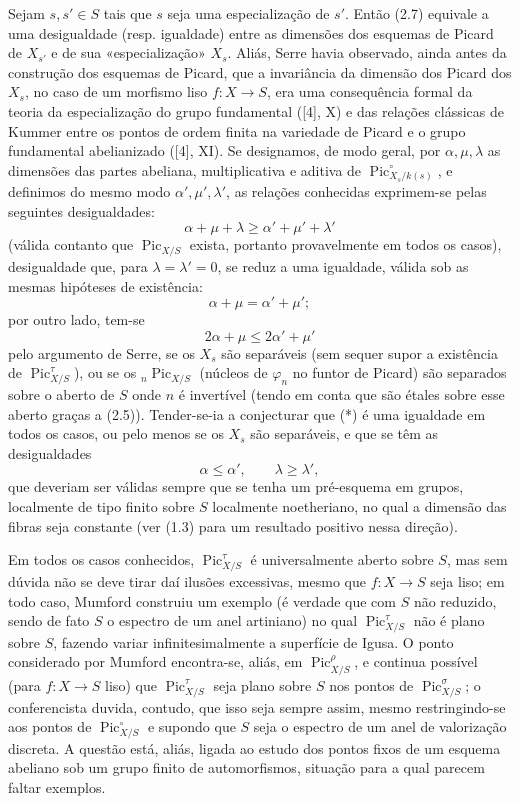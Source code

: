 Sejam $s,s'\in S$ tais que $s$ seja uma especialização
de $s'$. Então (2.7) equivale a uma desigualdade (resp. igualdade) entre as
dimensões dos esquemas de Picard de $X_{s'}$ e de sua «especialização» $X_s$.
Aliás, Serre havia observado, ainda antes da construção dos esquemas de Picard,
que a invariância da dimensão dos Picard dos $X_s$, no caso de um morfismo liso
$f:X\longrightarrow S$, era uma consequência formal da teoria da
especialização do grupo fundamental ([4], X) e das relações clássicas de Kummer
entre os pontos de ordem finita na variedade de Picard e o grupo fundamental
abelianizado ([4], XI). Se designamos, de modo geral, por $\alpha,\mu,\lambda$
as dimensões das partes abeliana, multiplicativa e aditiva de
$\operatorname{Pic}_{X_s/k(s)}^\circ$, e definimos do mesmo modo
$\alpha',\mu',\lambda'$, as relações conhecidas exprimem-se pelas seguintes
desigualdades:
\[
\tag{*}\alpha+\mu+\lambda\geq\alpha'+\mu'+\lambda'
\]
(válida contanto que $\operatorname{Pic}_{X/S}$ exista, portanto provavelmente
em todos os casos), desigualdade que, para $\lambda=\lambda'=0$, se reduz a uma
igualdade, válida sob as mesmas hipóteses de existência:
\[
\alpha+\mu=\alpha'+\mu' ;
\]
por outro lado, tem-se
\[
\tag{**}2\alpha+\mu\leq2\alpha'+\mu'
\]
pelo argumento de Serre, se os $X_s$ são separáveis (sem sequer supor a
existência de $\operatorname{Pic}_{X/S}^\tau$), ou se os
${}_n\operatorname{Pic}_{X/S}$ (núcleos de $\varphi_n$ no funtor de Picard) são
separados sobre o aberto de $S$ onde $n$ é invertível (tendo em conta que são étales sobre esse aberto graças a (2.5)).
Tender-se-ia a conjecturar que (*) é uma igualdade em todos os casos, ou pelo
menos se os $X_s$ são separáveis, e que se têm as desigualdades
\[
\tag{***}\alpha\leq\alpha',\qquad\lambda\geq\lambda',
\]
que deveriam ser válidas sempre que se tenha um pré-esquema em grupos,
localmente de tipo finito sobre $S$ localmente noetheriano, no qual a dimensão
das fibras seja constante (ver (1.3) para um resultado positivo nessa direção).

 Em todos os casos conhecidos,
$\operatorname{Pic}_{X/S}^\tau$ é universalmente aberto sobre $S$, mas sem
dúvida não se deve tirar daí ilusões excessivas, mesmo que
$f:X\longrightarrow S$ seja liso; em todo caso, Mumford
construiu um exemplo (é verdade que com $S$ não reduzido, sendo de fato $S$ o
espectro de um anel artiniano) no qual $\operatorname{Pic}_{X/S}^\tau$ não é
plano sobre $S$, fazendo variar infinitesimalmente a superfície de Igusa. O
ponto considerado por Mumford encontra-se, aliás, em
$\operatorname{Pic}_{X/S}^\rho$, e continua possível (para
$f:X\longrightarrow S$ liso) que $\operatorname{Pic}_{X/S}^\tau$ seja plano
sobre $S$ nos pontos de $\operatorname{Pic}_{X/S}^\sigma$; o conferencista
duvida, contudo, que isso seja sempre assim, mesmo restringindo-se aos pontos de
$\operatorname{Pic}_{X/S}^\circ$ e supondo que $S$ seja o espectro de um anel
de valorização discreta. A questão está, aliás, ligada ao estudo dos pontos
fixos de um esquema abeliano sob um grupo finito de automorfismos, situação
para a qual parecem faltar exemplos.

